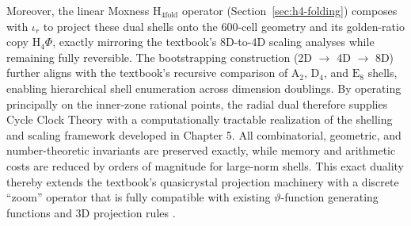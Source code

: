 \documentclass{article}
\begin{document}
Moreover, the linear Moxness \(\mathrm{H}_{4\mathrm{fold}}\) operator (Section~\ref{sec:h4-folding}) composes with \(\iota_r\) to project these dual shells onto the 600-cell geometry and its golden-ratio copy \(\mathrm{H}_4\Phi\), exactly mirroring the textbook’s 8D-to-4D scaling analyses while remaining fully reversible. The bootstrapping construction (2D \(\to\) 4D \(\to\) 8D) further aligns with the textbook’s recursive comparison of \(\mathrm{A}_2\), \(\mathrm{D}_4\), and \(\mathrm{E}_8\) shells, enabling hierarchical shell enumeration across dimension doublings.
By operating principally on the inner-zone rational points, the radial dual therefore supplies Cycle Clock Theory with a computationally tractable realization of the shelling and scaling framework developed in Chapter 5. All combinatorial, geometric, and number-theoretic invariants are preserved exactly, while memory and arithmetic costs are reduced by orders of magnitude for large-norm shells. This exact duality thereby extends the textbook’s quasicrystal projection machinery with a discrete “zoom” operator that is fully compatible with existing \(\vartheta\)-function generating functions and 3D projection rules \cite{FangIrwin2024,ClawsonFangIrwin2024}.
\end{document}
